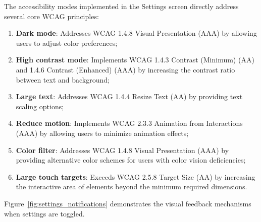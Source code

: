 \pagebreak

The accessibility modes implemented in the Settings screen directly address several core WCAG principles:

\begin{enumerate}
    \item \textbf{Dark mode}: Addresses WCAG 1.4.8 Visual Presentation (AAA) by allowing users to adjust color preferences;
    
    \item \textbf{High contrast mode}: Implements WCAG 1.4.3 Contrast (Minimum) (AA) and 1.4.6 Contrast (Enhanced) (AAA) by increasing the contrast ratio between text and background;
    
    \item \textbf{Large text}: Addresses WCAG 1.4.4 Resize Text (AA) by providing text scaling options;
    
    \item \textbf{Reduce motion}: Implements WCAG 2.3.3 Animation from Interactions (AAA) by allowing users to minimize animation effects;
    
    \item \textbf{Color filter}: Addresses WCAG 1.4.8 Visual Presentation (AAA) by providing alternative color schemes for users with color vision deficiencies;
    
    \item \textbf{Large touch targets}: Exceeds WCAG 2.5.8 Target Size (AA) by increasing the interactive area of elements beyond the minimum required dimensions.
\end{enumerate}

Figure~\ref{fig:settings_notifications} demonstrates the visual feedback mechanisms when settings are toggled.

